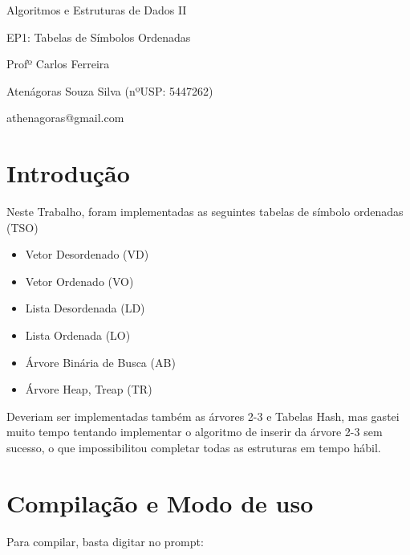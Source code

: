 \documentclass[a4paper]{article}
\begin{document}


\begin{center}
  \LARGE{Algoritmos e Estruturas de Dados II}
  
  \Large{EP1: Tabelas de Símbolos Ordenadas}

  Profº Carlos Ferreira
  
  Atenágoras Souza Silva (nºUSP: 5447262)

  athenagoras@gmail.com
\end{center}

\section{Introdução}

Neste Trabalho, foram implementadas as seguintes tabelas de símbolo ordenadas (TSO)
\begin{itemize}
  \item Vetor Desordenado (VD)
  \item Vetor Ordenado (VO)
  \item Lista Desordenada (LD)
  \item Lista Ordenada (LO)
  \item Árvore Binária de Busca (AB)
  \item Árvore Heap, Treap (TR)
\end{itemize}

Deveriam ser implementadas também as árvores 2-3 e Tabelas Hash, mas gastei muito tempo tentando implementar o algoritmo de inserir da árvore 2-3 sem sucesso, o que impossibilitou completar todas as estruturas em tempo hábil.

\section{Compilação e Modo de uso}
Para compilar, basta digitar no prompt:
\end{document}
